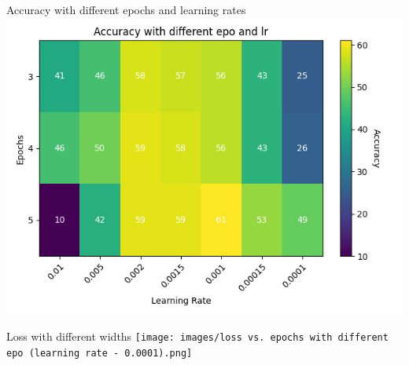 \begin{frame}{Accuracy with different epochs and learning rates}
    \includegraphics[scale=.6]{images/accuracy with different epo and lr.png}
\end{frame}

\begin{frame}{Loss with different widths}
    \texttt{[image: images/loss vs. epochs with different epo (learning rate - 0.0001).png]}
\end{frame}

